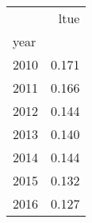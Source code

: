 \begin{tabular}{lr}
\toprule
 & ltue \\
year &  \\
\midrule
2010 & 0.171 \\
2011 & 0.166 \\
2012 & 0.144 \\
2013 & 0.140 \\
2014 & 0.144 \\
2015 & 0.132 \\
2016 & 0.127 \\
\bottomrule
\end{tabular}
